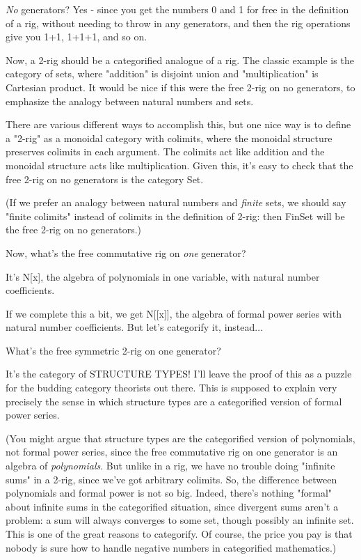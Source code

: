\emph{No} generators?  Yes - since you get the numbers 0 and 1 
for free in the definition of a rig, without needing to throw in any 
generators, and then the rig operations give you 1+1, 1+1+1, and so on.


Now, a 2-rig should be a categorified analogue of a rig.  The classic
example is the category of sets, where "addition" is disjoint
union and "multiplication" is Cartesian product.  It would be
nice if this were the free 2-rig on no generators, to emphasize the
analogy between natural numbers and sets.


There are various different ways to accomplish this, but one nice way is
to define a "2-rig" as a monoidal category with colimits,
where the monoidal structure preserves colimits in each argument.  The
colimits act like addition and the monoidal structure acts like
multiplication.  Given this, it's easy to check that the free 2-rig on
no generators is the category Set.

(If we prefer an analogy between natural numbers and \emph{finite} sets, we
should say "finite colimits" instead of colimits in the definition of
2-rig: then FinSet will be the free 2-rig on no generators.)

Now, what's the free commutative rig on \emph{one} generator?

It's N[x], the algebra of polynomials in one variable, with natural
number coefficients.

If we complete this a bit, we get N[[x]], the algebra of formal
power series with natural number coefficients.  But let's categorify
it, instead...

What's the free symmetric 2-rig on one generator?

It's the category of STRUCTURE TYPES!
I'll leave the proof of this as a puzzle for the budding category
theorists out there.  This is supposed to explain very precisely the
sense in which structure types are a categorified version of formal
power series.


(You might argue that structure types are the categorified version of
polynomials, not formal power series, since the free commutative rig on
one generator is an algebra of \emph{polynomials}.  But unlike in a
rig, we have no trouble doing "infinite sums" in a 2-rig,
since we've got arbitrary colimits.  So, the difference between
polynomials and formal power is not so big.  Indeed, there's nothing
"formal" about infinite sums in the categorified situation,
since divergent sums aren't a problem: a sum will always converges to
some set, though possibly an infinite set.  This is one of the great
reasons to categorify.  Of course, the price you pay is that nobody
is sure how to handle negative numbers in categorified mathematics.)

